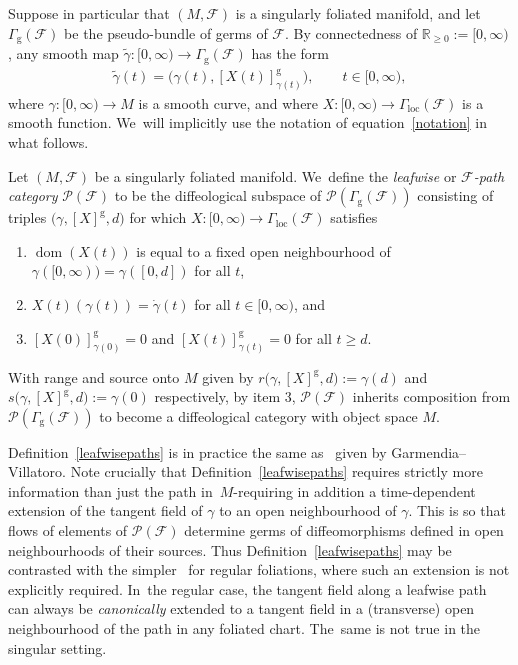 \documentclass[10pt,a4paper]{amsart}
\numberwithin{equation}{section}
\def\loc{\operatorname{loc}}
\def\g{\operatorname{g}}
\def\dom{\operatorname{dom}}
\def\FF{{\mathcal{F}}}
\def\PP{{\mathcal{P}}}
\def\RB{{\mathbb{R}}}
\begin{document}
Suppose in particular that $(M,\FF)$ is a singularly foliated manifold, and let $\Gamma_{\g}(\FF)$ be the pseudo-bundle of germs of $\FF$. By connectedness of $\RB_{\geq0}:=[0,\infty)$, any smooth map $\tilde{\gamma}\colon [0,\infty)\rightarrow\Gamma_{\g}(\FF)$ has the form
\begin{gather}\label{notation}
\tilde{\gamma}(t) = \big(\gamma(t),[X(t)]^{\g}_{\gamma(t)}\big),\qquad t\in[0,\infty),
\end{gather}
where $\gamma\colon [0,\infty)\rightarrow M$ is a smooth curve, and where $X\colon [0,\infty)\rightarrow\Gamma_{\loc}(\FF)$ is a smooth function. We~will implicitly use the notation of equation~\eqref{notation} in what follows.

\begin{Definition}\label{leafwisepaths}
Let $(M,\FF)$ be a singularly foliated manifold. We~define the \textit{leafwise} or \textit{$\FF$-path category} $\PP(\FF)$ to be the diffeological subspace of $\PP(\Gamma_{\g}(\FF))$ consisting of triples $\big(\gamma,[X]^{\g},d\big)$ for which $X\colon [0,\infty)\rightarrow\Gamma_{\loc}(\FF)$ satisfies
\begin{enumerate}\itemsep=0pt
\item[(1)] $\dom(X(t))$ is equal to a fixed open neighbourhood of $\gamma([0,\infty)) = \gamma([0,d])$ for all $t$,
\item[(2)] $X(t)(\gamma(t)) = \dot{\gamma}(t)$ for all $t\in[0,\infty)$, and
\item[(3)] $[X(0)]^{\g}_{\gamma(0)} = 0$ and $[X(t)]^{\g}_{\gamma(t)} = 0$ for all $t\geq d$.
\end{enumerate}
With range and source onto $M$ given by $r\big(\gamma,[X]^{\g},d\big):=\gamma(d)$ and $s\big(\gamma,[X]^{\g},d\big):=\gamma(0)$ respectively, by item 3, $\PP(\FF)$ inherits composition from $\PP(\Gamma_{\g}(\FF))$ to become a diffeological category with object space $M$.
\end{Definition}

Definition~\ref{leafwisepaths} is in practice the same as~\cite[Definition~3.1]{VilGar1} given by Garmendia--Villatoro. Note crucially that Definition~\ref{leafwisepaths} requires strictly more information than just the path in~$M$-re\-quiring in addition a time-dependent extension of the tangent field of $\gamma$ to an open neighbourhood of $\gamma$. This is so that flows of elements of $\PP(\FF)$ determine germs of diffeomorphisms defined in open neighbourhoods of their sources. Thus Definition~\ref{leafwisepaths} may be contrasted with the simpler~\cite[Definition~3.23]{mac3} for regular foliations, where such an extension is not explicitly required. In~the regular case, the tangent field along a leafwise path can always be \textit{canonically} extended to a tangent field in a (transverse) open neighbourhood of the path in any foliated chart. The~same is not true in the singular setting.
\end{document}
